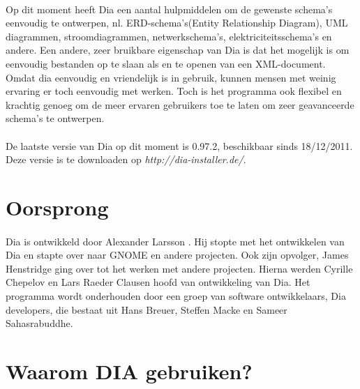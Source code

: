 \documentclass[12pt,a4paper]{report}
\begin{document}
\begin{flushleft}
\paragraph*{}
Op dit moment heeft Dia een aantal hulpmiddelen om de gewenste schema's eenvoudig te ontwerpen, nl. ERD-schema's(Entity Relationship Diagram), UML diagrammen, stroomdiagrammen, netwerkschema's, elektriciteitsschema's en andere. Een andere, zeer bruikbare eigenschap van Dia is dat het mogelijk is om eenvoudig bestanden op te slaan als en te openen van een XML-document.
Omdat dia eenvoudig en vriendelijk is in gebruik, kunnen mensen met weinig ervaring er toch eenvoudig met werken. Toch is het programma ook flexibel en krachtig genoeg om de meer ervaren gebruikers toe te laten om zeer geavanceerde schema's te ontwerpen.
\paragraph*{}
De laatste versie van Dia op dit moment is 0.97.2, beschikbaar sinds 18/12/2011. Deze versie is te downloaden op \textit{http://dia-installer.de/}.
\pagebreak
\section{Oorsprong}
\paragraph*{}
Dia is ontwikkeld door Alexander Larsson . Hij stopte met het ontwikkelen van Dia en stapte over naar GNOME en andere projecten. Ook zijn opvolger, James Henstridge ging over tot het werken met andere projecten. Hierna werden Cyrille Chepelov en Lars Raeder Clausen hoofd van ontwikkeling van Dia. Het programma wordt onderhouden door een groep van software ontwikkelaars, Dia developers, die bestaat uit Hans Breuer, Steffen Macke en Sameer Sahasrabuddhe.
\section{Waarom DIA gebruiken?}

\end{flushleft}
\end{document}
